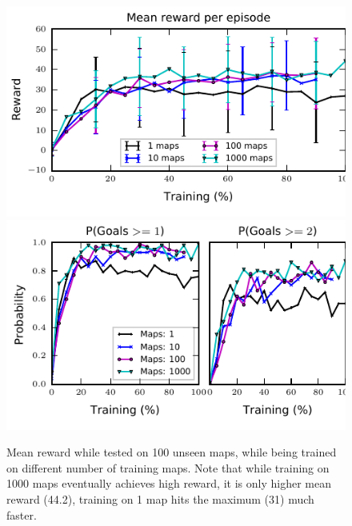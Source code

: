 \begin{figure}%
\includegraphics[width=0.5\columnwidth]{images/plot_reward_3D-1000.pdf}%
\includegraphics[width=0.5\columnwidth]{images/plot_probability_3D-1000.pdf}%
\vspace{-1em}%
\caption{Mean reward while tested on 100 unseen maps, while being trained on different number of training maps. Note that while training on 1000 maps eventually achieves high reward, it is only higher mean reward (44.2), training on 1 map hits the maximum (31) much faster.}%
\label{fig:plot_reward_on_testing}%
\end{figure}

